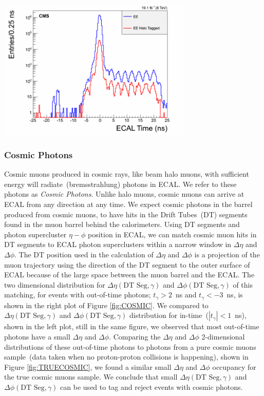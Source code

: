 \begin{minipage}{0.90\linewidth} 
\begin{center}
\centering
\includegraphics[height=0.45\textwidth, width=0.7\textwidth]{THESISPLOTS/halo_EE_Time.png}
\label{fig:HALOENDCAP}
\end{center} 
\end{minipage}

\subsubsection{Cosmic Photons} 
Cosmic muons produced in cosmic rays, like beam halo muons, with sufficient energy will radiate~(bremsstrahlung) photons in ECAL. We refer to these photons as \textit{Cosmic Photons}. Unlike halo muons, cosmic muons can arrive at ECAL from any direction at any time. We expect cosmic photons in the barrel produced from cosmic muons, to have hits in the Drift Tubes~(DT) segments found in the muon barrel behind the calorimeters. Using DT segments and  photon supercluster $\eta-\phi$ position in ECAL, we can match cosmic muon hits in DT segments to ECAL photon superclusters within a narrow window in $\Delta\eta$ and $\Delta\phi$. The DT position used in the calculation of $\Delta\eta$ and $\Delta\phi$ is a projection of the muon trajectory using the direction of the DT segment to the outer surface of ECAL because of the large space between the muon barrel and the ECAL. The two dimensional distribution for $\Delta\eta(\mbox{DT Seg},\gamma)$ and $\Delta\phi(\mbox{DT Seg},\gamma)$ of this matching, for events with out-of-time photons; $t_{\gamma} > 2$~ns and $t_{\gamma} < -3$~ns, is shown in the right plot of Figure \ref{fig:COSMIC}. We compared to $\Delta\eta(\mbox{DT Seg},\gamma)$ and $\Delta\phi(\mbox{DT Seg},\gamma)$ distribution for in-time~($|t_{\gamma}| < 1$~ns), shown in the left plot, still in the same figure, we observed that most out-of-time photons have a small $\Delta\eta$ and $\Delta\phi$. Comparing the $\Delta\eta$  and $\Delta\phi$ 2-dimensional distributions of these out-of-time photons to photons from a pure cosmic muons sample~(data taken when no proton-proton collisions is happening), shown in Figure \ref{fig:TRUECOSMIC}, we found a similar small $\Delta\eta$ and $\Delta\phi$ occupancy for the true cosmic muons sample. We conclude that small $\Delta\eta(\mbox{DT Seg},\gamma)$  and $\Delta\phi(\mbox{DT Seg},\gamma)$ can be used to tag and reject events with cosmic photons.


